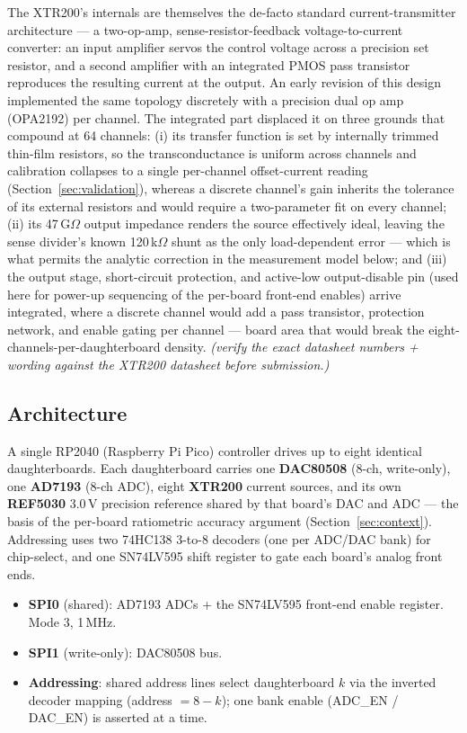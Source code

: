 \documentclass[11pt]{article}
\newif\ifdraft\drafttrue
\newcommand{\note}[1]{\ifdraft{\color{blue!60!black}\textit{(#1)}}\fi}
\begin{document}
The XTR200's internals are themselves the de-facto standard current-transmitter
architecture --- a two-op-amp, sense-resistor-feedback voltage-to-current
converter: an input amplifier servos the control voltage across a precision set
resistor, and a second amplifier with an integrated PMOS pass transistor
reproduces the resulting current at the output. An early revision of this
design implemented the same topology discretely with a precision dual op amp
(OPA2192) per channel. The integrated part displaced it on three grounds that
compound at 64 channels: (i) its transfer function is set by internally trimmed
thin-film resistors, so the transconductance is uniform across channels and
calibration collapses to a single per-channel offset-current reading
(Section~\ref{sec:validation}), whereas a discrete channel's gain inherits the
tolerance of its external resistors and would require a two-parameter fit on
every channel; (ii) its 47\,G$\Omega$ output impedance renders the source
effectively ideal, leaving the sense divider's known 120\,k$\Omega$ shunt as
the only load-dependent error --- which is what permits the analytic
correction in the measurement model below; and (iii) the output stage,
short-circuit protection, and active-low output-disable pin (used here for
power-up sequencing of the per-board front-end enables) arrive integrated,
where a discrete channel would add a pass transistor, protection network, and
enable gating per channel --- board area that would break the
eight-channels-per-daughterboard density.
\note{verify the exact datasheet numbers + wording against the XTR200
datasheet before submission.}

\subsection{Architecture}
A single RP2040 (Raspberry Pi Pico) controller drives up to eight identical
daughterboards. Each daughterboard carries one \textbf{DAC80508} (8-ch,
write-only), one \textbf{AD7193} (8-ch ADC), eight \textbf{XTR200} current
sources, and its own \textbf{REF5030} 3.0\,V precision reference shared by that
board's DAC and ADC --- the basis of the per-board ratiometric accuracy
argument (Section~\ref{sec:context}). Addressing uses two 74HC138 3-to-8
decoders (one per ADC/DAC bank)
for chip-select, and one SN74LV595 shift register to gate each board's analog
front ends.

\begin{itemize}[nosep]
  \item \textbf{SPI0} (shared): AD7193 ADCs + the SN74LV595 front-end enable
        register. Mode 3, 1\,MHz.
  \item \textbf{SPI1} (write-only): DAC80508 bus.
  \item \textbf{Addressing}: shared address lines select daughterboard $k$ via
        the inverted decoder mapping (address $= 8-k$); one bank enable
        (ADC\_EN / DAC\_EN) is asserted at a time.
\end{itemize}
\end{document}
